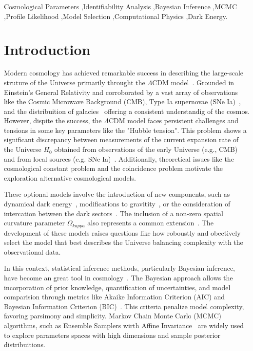 \documentclass[final,3p,times]{elsarticle}
\begin{document}
\begin{frontmatter}
\begin{abstract}
\end{abstract}

\begin{keyword}

Cosmological Parameters \sep Identifiability Analysis \sep Bayesian Inference \sep MCMC \sep Profile Likelihood \sep Model Selection \sep Computational Physics \sep Dark Energy.

\end{keyword}

\end{frontmatter}

\section{Introduction}
\label{sec:introduction}

Modern cosmology has achieved remarkable success in describing the large-scale struture of the Universe primarily throught the $\Lambda\text{CDM}$ model~\cite{PeeblesRatra2003,Planck2020}.
Grounded in Einstein's General Relativity and corroborated by a vast array of observations like the Cosmic Microwave Background (CMB)\cite{Hinshaw2013}, Type Ia supernovae (SNe Ia)~\cite{Perlmutter1999,Riess1998}, and the distribuition of galacies~\cite{Einstein2005} offering a consistent understandig of the cosmos.
However, dispite the success, the $\Lambda\text{CDM}$ model faces persistent challenges and tensions in some key parameters like the "Hubble tension". This problem shows a significant discrepancy between measurements of the current expansion rate of the Universe $H_0$ obtained from observations of the early Universe (e.g., CMB) and from local sources (e.g. SNe Ia)~\cite{Riess2019,Verde2019}.
Additionally, theoretical issues like the cosmological constant problem and the coincidence problem motivate the exploration alternative cosmological models.

These optional models involve the introduction of new components, such as dynamical dark energy~\cite{}, modifications to gravitity~\cite{}, or the consideration of intercation between the dark sectors~\cite{Wang2016,Yang2019_IDE_example}. The inclusion of a non-zero spatial curvature parameter $\Omega_{kappa}$ also represents a common extension~\cite{}.
The development of these models raises questions like how roboustly and obectively select the model that best describes the Universe balancing complexity with the observational data.

In this context, statistical inference methods, particularly Bayesian inference, have become an great tool in cosmology~\cite{Trotta2008}. The Bayesian approach allows the incorporation of prior knowledge, quantification of uncertainties, and model comparision through metrics like Akaike Information Criterion (AIC) and Bayesian Information Criterion (BIC)~\cite{Liddle2007,Akaike1974}.
This criteria penalize model complexity, favoring parsimony and simplicity. Markov Chain Monte Carlo (MCMC) algorithms, such as Ensemble Samplers wirth Affine Invariance~\cite{GoodmanWeare2010} are widely used to explore parameters spaces with high dimensions and sample posterior distribuitions.
\end{document}
